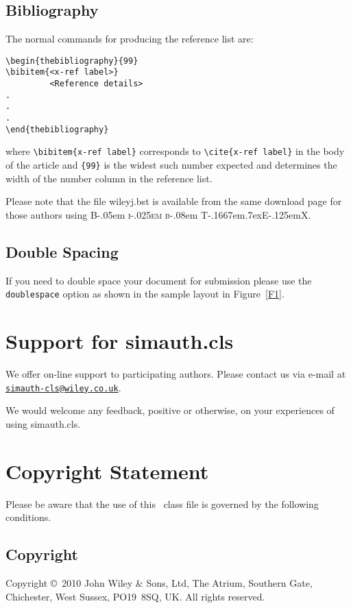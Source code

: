 \documentclass[times]{simauth}
\newcommand\BibTeX{{\rmfamily B\kern-.05em \textsc{i\kern-.025em b}\kern-.08em
T\kern-.1667em\lower.7ex\hbox{E}\kern-.125emX}}
\begin{document}
\pagebreak

\subsection{Bibliography}
The normal commands for producing the reference list are:
\begin{verbatim}
\begin{thebibliography}{99}
\bibitem{<x-ref label>}
         <Reference details>
.
.
.
\end{thebibliography}
\end{verbatim}
where \verb"\bibitem{x-ref label}" corresponds to
\verb"\cite{x-ref label}" in the body of the article and
\verb"{99}" is the widest such number expected and determines the
width of the number column in the reference list.

Please note that the file \textsf{wileyj.bst} is available from
the same download page for those authors using \BibTeX.

\subsection{Double Spacing}
If you need to double space your document for submission please
use the \verb+doublespace+ option as shown in the sample layout in
Figure~\ref{F1}.

\section{Support for \textsf{simauth.cls}}
We offer on-line support to participating authors. Please contact
us via e-mail at\\
\href{mailto:simauth-cls@wiley.co.uk}{\texttt{simauth-cls@wiley.co.uk}}.

\noindent We would welcome any feedback, positive or otherwise, on
your experiences of using \textsf{simauth.cls}.

\section{Copyright Statement}
Please  be  aware that the use of  this \LaTeXe\ class file is
governed by the following conditions.

\subsection{Copyright}
Copyright \copyright\ 2010 John Wiley \& Sons, Ltd, The Atrium,
Southern Gate, Chichester, West Sussex, PO19~8SQ, UK.   All rights
reserved.
\end{document}
